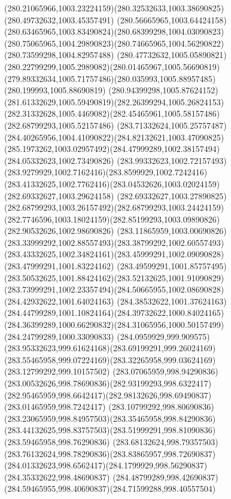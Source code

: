 {{		\curveto(280.21065966,1003.23224159)(280.32532633,1003.38690825)(280.49732632,1003.45357491)
		\curveto(280.56665965,1003.64424158)(280.63465965,1003.83490824)(280.68399298,1004.03090823)
		\curveto(280.75065965,1004.29890823)(280.74665965,1004.56290822)(280.73599298,1004.82957488)
		\curveto(280.47732632,1005.05890821)(280.22799299,1005.2989082)(280.01465967,1005.56690819)
		\curveto(279.89332634,1005.71757486)(280.035993,1005.88957485)(280.199993,1005.88690819)
		\curveto(280.94399298,1005.87624152)(281.61332629,1005.59490819)(282.26399294,1005.26824153)
		\curveto(282.31332628,1005.4469082)(282.45465961,1005.58157486)(282.68799293,1005.52157486)
		\curveto(283.71332624,1005.25757487)(284.40265956,1004.41090822)(284.82132621,1003.47090825)
		\curveto(285.1973262,1003.02957492)(284.47999289,1002.38157494)(284.05332623,1002.73490826)
		\curveto(283.99332623,1002.72157493)(283.9279929,1002.7162416)(283.8599929,1002.7242416)
		\curveto(283.41332625,1002.7762416)(283.04532626,1003.02024159)(282.69332627,1003.29624158)
		\curveto(282.69332627,1003.27890825)(282.68799293,1003.26157492)(282.68799293,1003.24424159)
		\curveto(282.7746596,1003.18024159)(282.85199293,1003.09890826)(282.90532626,1002.98690826)
		\curveto(283.11865959,1003.00690826)(283.33999292,1002.88557493)(283.38799292,1002.60557493)
		\curveto(283.43332625,1002.34824161)(283.45999291,1002.09090828)(283.47999291,1001.83224162)
		\curveto(283.49599291,1001.85757495)(283.50532625,1001.88424162)(283.52132625,1001.91090829)
		\curveto(283.73999291,1002.23357494)(284.50665955,1002.08690828)(284.42932622,1001.64024163)
		\curveto(284.38532622,1001.37624163)(284.44799289,1001.10824164)(284.39732622,1000.84024165)
		\curveto(284.36399289,1000.66290832)(284.31065956,1000.50157499)(284.24799289,1000.33090833)
		\curveto(284.0959929,999.909575)(283.95332623,999.61624168)(283.69199291,999.26024169)
		\curveto(283.55465958,999.07224169)(283.32265958,999.03624169)(283.12799292,999.10157502)
		\curveto(283.07065959,998.94290836)(283.00532626,998.78690836)(282.93199293,998.6322417)
		\curveto(282.95465959,998.6642417)(282.98132626,998.69490837)(283.01465959,998.7242417)
		\curveto(283.10799292,998.80690836)(283.23065959,998.84957503)(283.35465958,998.84290836)
		\curveto(283.44132625,998.83757503)(283.51999291,998.81090836)(283.59465958,998.76290836)
		\curveto(283.68132624,998.79357503)(283.76132624,998.78290836)(283.83865957,998.72690837)
		\curveto(284.01332623,998.6562417)(284.1799929,998.56290837)(284.35332622,998.48690837)
		\curveto(284.48799289,998.42690837)(284.59465955,998.40690837)(284.71599288,998.40557504)
}}
